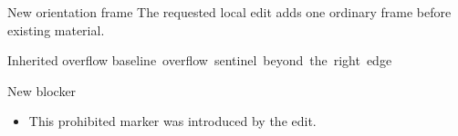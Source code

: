 \documentclass[11pt,aspectratio=169]{beamer}
\begin{document}
\begin{frame}{New orientation frame}
  The requested local edit adds one ordinary frame before existing material.
\end{frame}
\begin{frame}{Inherited overflow}
  \noindent\hspace{0.8\textwidth}%
  \mbox{baseline overflow sentinel beyond the right edge}
\end{frame}
\begin{frame}{New blocker}
  \begin{itemize}
    \item[$\Rightarrow$] This prohibited marker was introduced by the edit.
  \end{itemize}
\end{frame}
\end{document}
